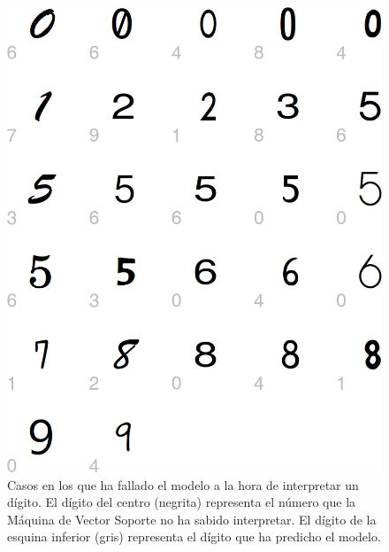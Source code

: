 \documentclass[12pt,spanish,a4paper]{article}
\numberwithin{equation}{section}
\begin{document}
\begin{figure}[h]

{\centering \includegraphics[width=0.8\linewidth]{graphics/svm/digitos_fallados_modelo_svm_linear2_paso2_a-1} 

}

\caption{Casos en los que ha fallado el modelo a la hora de interpretar un dígito. El dígito del centro (negrita) representa el número que la Máquina de Vector Soporte no ha sabido interpretar. El dígito de la esquina inferior (gris) representa el dígito que ha predicho el modelo.}\label{fig:digitos_fallados_modelo_svm_linear2_paso2_a}
\end{figure}
\end{document}

